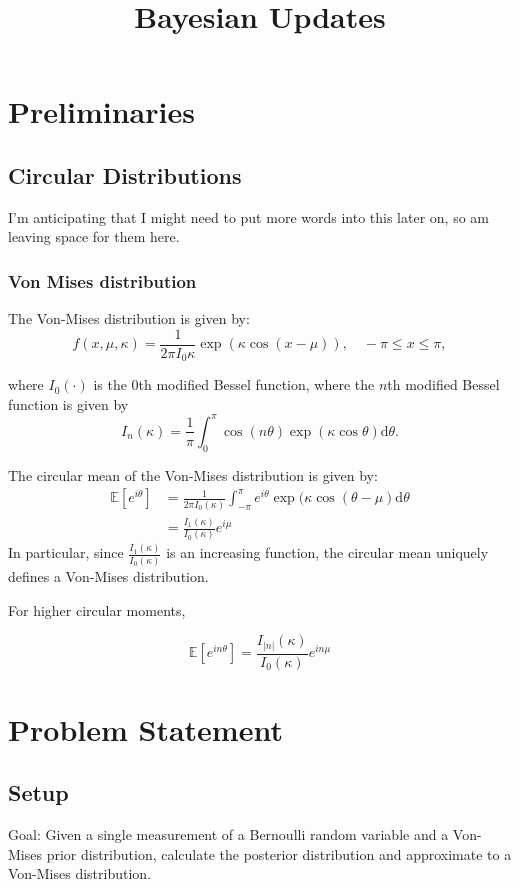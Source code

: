 \documentclass[]{report}
\title{Bayesian Updates}
\begin{document}
\maketitle
\chapter{Preliminaries}

\section{Circular Distributions}
I'm anticipating that I might need to put more words into this later on, so am leaving space for them here.

\subsection{Von Mises distribution}
The Von-Mises distribution is given by:
\[
f(x, \mu, \kappa) = \frac{1}{2 \pi I_0{\kappa}} \exp(\kappa \cos(x-\mu)), \quad - \pi \le x \le \pi,
\]

where $I_0(\cdot)$ is the $0$th modified Bessel function, where the $n$th modified Bessel function is given by
\[
I_{n}(\kappa) = \frac{1}{\pi} \int_0^\pi \cos(n\theta) \exp(\kappa \cos \theta) \text{d}\theta.
\]

The circular mean of the Von-Mises distribution is given by:
\begin{align*}
	\mathbb{E} [e^{i \theta}] &= \frac{1}{2 \pi I_0(\kappa)} \int_{- \pi}^{\pi} e^{i \theta} \exp(\kappa \cos (\theta - \mu)  \text{d}\theta   \\
	& = \frac{I_{1}(\kappa)}{I_0(\kappa)} e^{i \mu}
\end{align*}
In particular, since $\frac{I_{1}(\kappa)}{I_0(\kappa)}$ is an increasing function, the circular mean uniquely defines a Von-Mises distribution.

For higher circular moments,

\[
\mathbb{E} [e^{i n \theta}] = \frac{I_{|n|}(\kappa)}{I_0(\kappa)} e^{i n \mu}
\]

\chapter{Problem Statement}
\section{Setup}
Goal: Given a single measurement of a Bernoulli random variable and a Von-Mises prior distribution, calculate the posterior distribution and approximate to a Von-Mises distribution.
\end{document}
